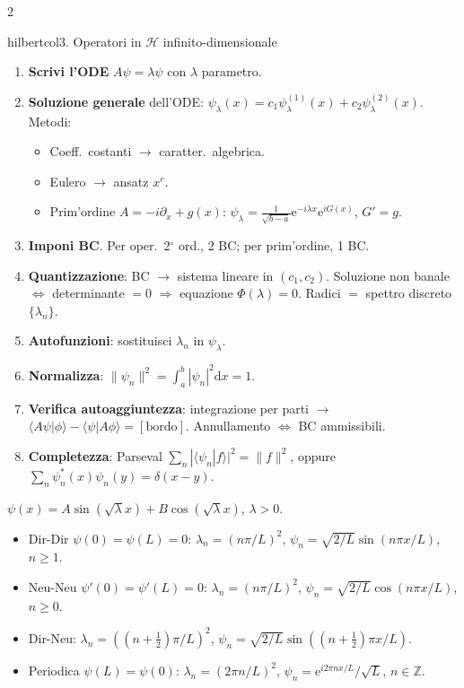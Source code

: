 \documentclass[10pt,a4paper]{article}
\newcommand{\Z}{\mathbb{Z}}
\newcommand{\dd}{\mathrm{d}}
\newcommand{\eu}{\mathrm{e}}
\newcommand{\braket}[2]{\langle#1|#2\rangle}
\begin{document}
\begin{multicols}{2}
\begin{secbox}{hilbertcol}{3. Operatori in $\mathcal H$ infinito-dimensionale}
\begin{enumerate}
\item \textbf{Scrivi l'ODE} $A\psi=\lambda\psi$ con $\lambda$ parametro.
\item \textbf{Soluzione generale} dell'ODE: $\psi_\lambda(x)=c_1\psi^{(1)}_\lambda(x)+c_2\psi^{(2)}_\lambda(x)$. Metodi:
  \begin{itemize}
  \item Coeff.\ costanti $\to$ caratter.\ algebrica.
  \item Eulero $\to$ ansatz $x^r$.
  \item Prim'ordine $A=-i\partial_x+g(x)$: $\psi_\lambda=\frac{1}{\sqrt{b-a}}\eu^{-i\lambda x}\eu^{iG(x)}$, $G'=g$.
  \end{itemize}
\item \textbf{Imponi BC}. Per oper.\ 2$^\circ$ ord., 2 BC; per prim'ordine, 1 BC.
\item \textbf{Quantizzazione}: BC $\to$ sistema lineare in $(c_1,c_2)$. Soluzione non banale $\iff$ determinante $=0$ $\Rightarrow$ equazione $\Phi(\lambda)=0$. Radici $=$ spettro discreto $\{\lambda_n\}$.
\item \textbf{Autofunzioni}: sostituisci $\lambda_n$ in $\psi_\lambda$.
\item \textbf{Normalizza}: $\|\psi_n\|^2=\int_a^b|\psi_n|^2\dd x=1$.
\item \textbf{Verifica autoaggiuntezza}: integrazione per parti $\to$ $\braket{A\psi}{\phi}-\braket{\psi}{A\phi}=[\text{bordo}]$. Annullamento $\iff$ BC ammissibili.
\item \textbf{Completezza}: Parseval $\sum_n|\braket{\psi_n}{f}|^2=\|f\|^2$, oppure $\sum_n\psi_n^*(x)\psi_n(y)=\delta(x-y)$.
\end{enumerate}

$\psi(x)=A\sin(\sqrt\lambda x)+B\cos(\sqrt\lambda x)$, $\lambda>0$.
\begin{itemize}
\item Dir-Dir $\psi(0)=\psi(L)=0$: $\lambda_n=(n\pi/L)^2$, $\psi_n=\sqrt{2/L}\sin(n\pi x/L)$, $n\ge 1$.
\item Neu-Neu $\psi'(0)=\psi'(L)=0$: $\lambda_n=(n\pi/L)^2$, $\psi_n=\sqrt{2/L}\cos(n\pi x/L)$, $n\ge 0$.
\item Dir-Neu: $\lambda_n=((n+\tfrac12)\pi/L)^2$, $\psi_n=\sqrt{2/L}\sin((n+\tfrac12)\pi x/L)$.
\item Periodica $\psi(L)=\psi(0)$: $\lambda_n=(2\pi n/L)^2$, $\psi_n=\eu^{i2\pi nx/L}/\sqrt L$, $n\in\Z$.
\end{itemize}


\end{secbox}
\end{multicols}
\end{document}
